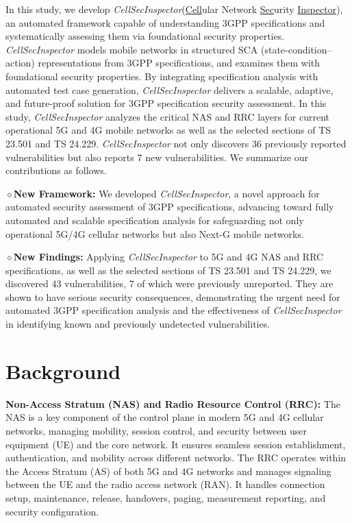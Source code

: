\documentclass[sigconf]{acmart}
\newcommand{\lm}{\textit{CellSecInspector}\xspace}
\begin{document}
In this study, we develop \lm (\ul{Cell}ular Network \ul{Sec}urity \ul{Inspector}), an automated framework capable of understanding 3GPP specifications and systematically assessing them via foundational security properties. \lm models mobile networks in structured SCA (state-condition–action) representations from 3GPP specifications, and examines them with foundational security properties. By integrating specification analysis with automated test case generation, \lm delivers a scalable, adaptive, and future-proof solution for 3GPP specification security assessment. In this study, \lm analyzes the critical NAS and RRC layers for current operational 5G and 4G mobile networks as well as the selected sections of TS 23.501 and TS 24.229. 
\lm not only discovers 36 previously reported vulnerabilities but also reports 7 new vulnerabilities.
We summarize our contributions as follows. 

\noindent $\diamond$\textbf{New Framework:} We developed \lm, a novel approach for automated security assessment of 3GPP specifications, advancing toward fully automated and scalable specification analysis for safeguarding not only operational 5G/4G cellular networks but also Next-G mobile networks.  

\noindent $\diamond$\textbf{New Findings:} Applying \lm to 5G and 4G NAS and RRC specifications, as well as the selected sections of TS 23.501 and TS 24.229, we discovered 43 vulnerabilities, 7 of which were previously unreported. They are shown to have serious security consequences, demonstrating the urgent need for automated 3GPP specification analysis and the effectiveness of \lm in identifying known and previously undetected vulnerabilities. 



\section{Background}


\noindent \textbf{Non-Access Stratum (NAS) and Radio Resource Control (RRC):} The NAS is a key component of the control plane in modern 5G and 4G cellular networks, managing mobility, session control, and security between user equipment (UE) and the core network. It ensures seamless session establishment, authentication, and mobility across different networks. The RRC operates within the Access Stratum (AS) of both 5G and 4G networks and manages signaling between the UE and the radio access network (RAN). It handles connection setup, maintenance, release, handovers, paging, measurement reporting, and security configuration.
\end{document}
